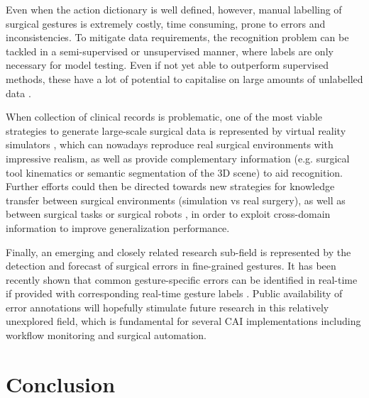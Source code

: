 \documentclass[journal]{IEEEtran}
\begin{document}
Even when the action dictionary is well defined, however, manual labelling of surgical gestures is extremely costly, time consuming, prone to errors and inconsistencies.
To mitigate data requirements, the recognition problem can be tackled in a semi-supervised or unsupervised manner, where labels are only necessary for model testing. Even if not yet able to outperform supervised methods, these have a lot of potential to capitalise on large amounts of unlabelled data \cite{Fu2019}. 

When collection of clinical records is problematic, one of the most viable strategies to generate large-scale surgical data is represented by virtual reality simulators \cite{Bovo2017}, which can nowadays reproduce real surgical environments with impressive realism, as well as provide complementary information (e.g. surgical tool kinematics or semantic segmentation of the 3D scene) to aid recognition.
Further efforts could then be directed towards new strategies for knowledge transfer between surgical environments (simulation vs real surgery), as well as between surgical tasks \cite{Tsai2019, Rupprecht2016} or surgical robots \cite{Madapana2020}, in order to exploit cross-domain information to improve generalization performance.

Finally, an emerging and closely related research sub-field is represented by the detection and forecast of surgical errors in fine-grained gestures.
It has been recently shown that common gesture-specific errors can be identified in real-time if provided with corresponding real-time gesture labels \cite{Yasar2020}.
Public availability of error annotations \cite{Yasar2020} will hopefully stimulate future research in this relatively unexplored field, which is fundamental for several CAI implementations including workflow monitoring and surgical automation.
 
\section{Conclusion}
\end{document}

